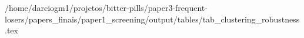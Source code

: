 /home/darciogm1/projetos/bitter-pills/paper3-frequent-losers/papers_finais/paper1_screening/output/tables/tab_clustering_robustness.tex